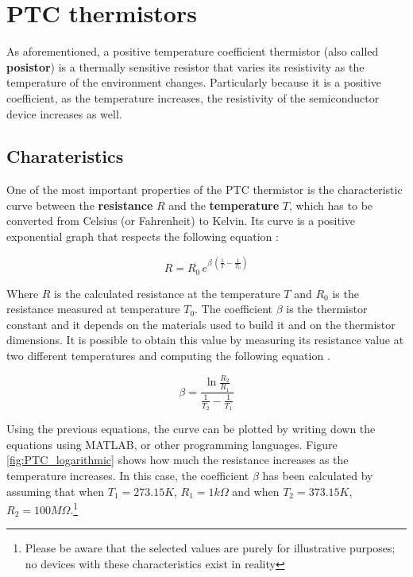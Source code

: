 \section{PTC thermistors}
As aforementioned, a positive temperature coefficient thermistor (also called \textbf{posistor}) is a thermally sensitive resistor that varies its resistivity as the temperature of the environment changes. Particularly because it is a positive coefficient, as the temperature increases, the resistivity of the semiconductor device increases as well.

\subsection{Charateristics}
One of the most important properties of the PTC thermistor is the characteristic curve between the \textbf{resistance} $R$ and the \textbf{temperature} $T$, which has to be converted from Celsius (or Fahrenheit) to Kelvin. Its curve is a positive exponential graph that respects the following equation \cite{Saburi196353}:

\begin{equation*}
    R = R_0\,e^{\beta\,(\frac{1}{T} - \frac{1}{T_0})}
\end{equation*}

\noindent Where $R$ is the calculated resistance at the temperature $T$ and $R_0$ is the resistance measured at temperature $T_0$. The coefficient $\beta$ is the thermistor constant and it depends on the materials used to build it and on the thermistor dimensions. It is possible to obtain this value by measuring its resistance value at two different temperatures and computing the following equation \cite{Saburi196353}.

\begin{equation*}
    \beta = \frac{\ln{\frac{R_2}{R_1}}}{\frac{1}{T_2} - \frac{1}{T_1}}
\end{equation*}

\noindent Using the previous equations, the curve can be plotted by writing down the equations using MATLAB, or other programming languages. Figure \ref{fig:PTC_logarithmic} shows how much the resistance increases as the temperature increases. In this case, the coefficient $\beta$ has been calculated by assuming that when $T_1 = 273.15 K$, $R_1 = 1k\Omega$ and when $T_2 = 373.15 K$, $R_2 = 100M\Omega$.\footnote{Please be aware that the selected values are purely for illustrative purposes; no devices with these characteristics exist in reality}

